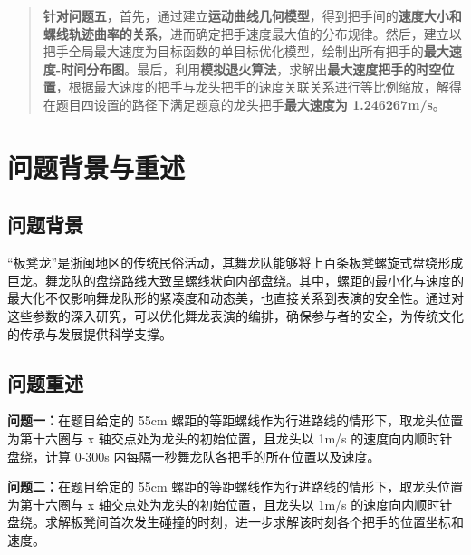 \documentclass[a4paper]{article}
\begin{document}
\begin{abstract}
		\textbf{针对问题五}，首先，通过建立\textbf{运动曲线几何模型}，得到把手间的\textbf{速度大小和螺线轨迹曲率的关系}，进而确定把手速度最大值的分布规律。然后，建立以把手全局最大速度为目标函数的单目标优化模型，绘制出所有把手的\textbf{最大速度-时间分布图}。最后，利用\textbf{模拟退火算法}，求解出\textbf{最大速度把手的时空位置}，根据最大速度的把手与龙头把手的速度关联关系进行等比例缩放，解得在题目四设置的路径下满足题意的龙头把手\textbf{最大速度为 1.246267m/s}。  \\
		\newline
	\end{abstract}

	\clearpage %

	\section{问题背景与重述}
	\subsection{问题背景}
	“板凳龙”是浙闽地区的传统民俗活动，其舞龙队能够将上百条板凳螺旋式盘绕形成巨龙。舞龙队的盘绕路线大致呈螺线状向内部盘绕。其中，螺距的最小化与速度的最大化不仅影响舞龙队形的紧凑度和动态美，也直接关系到表演的安全性。通过对这些参数的深入研究，可以优化舞龙表演的编排，确保参与者的安全，为传统文化的传承与发展提供科学支撑。


	\subsection{问题重述}
		\textbf{问题一：}在题目给定的 55cm 螺距的等距螺线作为行进路线的情形下，取龙头位置为第十六圈与 x 轴交点处为龙头的初始位置，且龙头以 1m/s 的速度向内顺时针盘绕，计算 0-300s 内每隔一秒舞龙队各把手的所在位置以及速度。

		\textbf{问题二：}在题目给定的 55cm 螺距的等距螺线作为行进路线的情形下，取龙头位置为第十六圈与 x 轴交点处为龙头的初始位置，且龙头以 1m/s 的速度向内顺时针盘绕。求解板凳间首次发生碰撞的时刻，进一步求解该时刻各个把手的位置坐标和速度。
\end{document}
